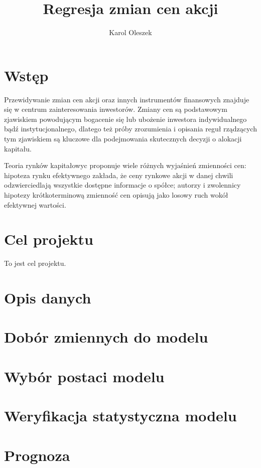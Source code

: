 \documentclass{article}
\begin{document}
\title{Regresja zmian cen akcji}
\author{Karol Oleszek}

\maketitle
\newpage
\tableofcontents
\newpage

\section{Wstęp}
Przewidywanie zmian cen akcji oraz innych instrumentów finansowych znajduje się w centrum zainteresowania inwestorów. Zmiany cen są podstawowym zjawiskiem powodującym bogacenie się lub ubożenie inwestora indywidualnego bądź instytucjonalnego, dlatego też próby zrozumienia i opisania reguł rządzących tym zjawiskiem są kluczowe dla podejmowania skutecznych decyzji o alokacji kapitału.

Teoria rynków kapitałowyc proponuje wiele różnych wyjaśnień zmienności cen: hipoteza rynku efektywnego \textcite{Bachelier1900} zakłada, że ceny rynkowe akcji w danej chwili odzwierciedlają wszystkie dostępne informacje o spółce; autorzy i zwolennicy hipotezy krótkoterminową zmienność cen opisują jako losowy ruch wokół efektywnej wartości. 

\section{Cel projektu}
To jest cel projektu.

\section{Opis danych}

\section{Dobór zmiennych do modelu}

\section{Wybór postaci modelu}

\section{Weryfikacja statystyczna modelu}

\section{Prognoza}
\end{document}
